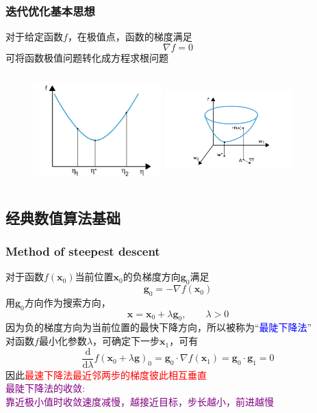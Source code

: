 {\frame
{
	\frametitle{迭代优化基本思想}
	对于给定函数$f$，在极值点，函数的梯度满足
	\begin{displaymath}
		\nabla f=0
	\end{displaymath}
	可将函数极值问题转化成方程求根问题
\begin{figure}[h!]
\centering
\includegraphics[height=1.68in,width=1.95in,viewport=30 0 450 360,clip]{Figures/OP_mini-1.png}
\hskip 0.05in
\includegraphics[height=1.68in,width=1.95in,viewport=150 20 560 390,clip]{Figures/OP_mini-2.png}
\label{OP_mini}
\end{figure}
}

\subsection{经典数值算法基础}
\frame
{
	\frametitle{\textrm{Method of steepest descent}}
	对于函数$f(\mathbf{x}_0)$当前位置$\mathbf{x}_0$的负梯度方向$\mathbf{g}_0$满足
	\begin{displaymath}
		\mathbf{g}_0=-\nabla f(\mathbf{x}_0)
	\end{displaymath}
	用$\mathbf{g}_0$方向作为搜索方向，
	\begin{displaymath}
		\mathbf{x}=\mathbf{x}_0+\lambda\mathbf{g}_0,\qquad \lambda>0
	\end{displaymath}
	因为负的梯度方向为当前位置的最快下降方向，所以被称为“\textcolor{blue}{最陡下降法}”\\
	对函数$f$最小化参数$\lambda$，可确定下一步$\mathbf{x}_1$，可有
	\begin{displaymath}
		\dfrac{\mathrm{d}}{\mathrm{d}\lambda}f(\mathbf{x}_0+\lambda\mathbf{g})_0=\mathbf{g}_0\cdot\nabla f(\mathbf{x}_1)=\mathbf{g}_0\cdot\mathbf{g}_1=0
	\end{displaymath}
	因此\textcolor{red}{最速下降法最近邻两步的梯度彼此相互垂直}\\
	\textcolor{purple}{最陡下降法的收敛:~\\靠近极小值时收敛速度减慢，越接近目标，步长越小，前进越慢}
}

}
